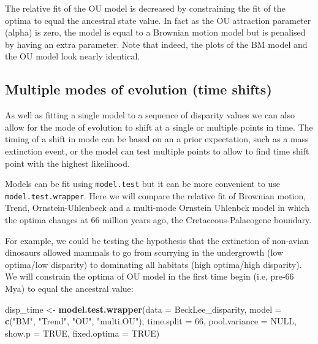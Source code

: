 \documentclass[
]{book}
\newenvironment{Shaded}{\begin{snugshade}}{\end{snugshade}}
\newcommand{\AttributeTok}[1]{\textcolor[rgb]{0.13,0.29,0.53}{#1}}
\newcommand{\ConstantTok}[1]{\textcolor[rgb]{0.56,0.35,0.01}{#1}}
\newcommand{\DecValTok}[1]{\textcolor[rgb]{0.00,0.00,0.81}{#1}}
\newcommand{\FunctionTok}[1]{\textcolor[rgb]{0.13,0.29,0.53}{\textbf{#1}}}
\newcommand{\NormalTok}[1]{#1}
\newcommand{\OtherTok}[1]{\textcolor[rgb]{0.56,0.35,0.01}{#1}}
\newcommand{\StringTok}[1]{\textcolor[rgb]{0.31,0.60,0.02}{#1}}
\begin{document}
The relative fit of the OU model is decreased by constraining the fit of the optima to equal the ancestral state value.
In fact as the OU attraction parameter (alpha) is zero, the model is equal to a Brownian motion model but is penalised by having an extra parameter.
Note that indeed, the plots of the BM model and the OU model look nearly identical.

\hypertarget{multiple-modes-of-evolution-time-shifts}{%
\subsection{Multiple modes of evolution (time shifts)}\label{multiple-modes-of-evolution-time-shifts}}

As well as fitting a single model to a sequence of disparity values we can also allow for the mode of evolution to shift at a single or multiple points in time.
The timing of a shift in mode can be based on an a prior expectation, such as a mass extinction event, or the model can test multiple points to allow to find time shift point with the highest likelihood.

Models can be fit using \texttt{model.test} but it can be more convenient to use \texttt{model.test.wrapper}.
Here we will compare the relative fit of Brownian motion, Trend, Ornstein-Uhlenbeck and a multi-mode Ornstein Uhlenbck model in which the optima changes at 66 million years ago, the Cretaceous-Palaeogene boundary.

For example, we could be testing the hypothesis that the extinction of non-avian dinosaurs allowed mammals to go from scurrying in the undergrowth (low optima/low disparity) to dominating all habitats (high optima/high disparity).
We will constrain the optima of OU model in the first time begin (i.e, pre-66 Mya) to equal the ancestral value:

\begin{Shaded}
\begin{Highlighting}[]
\NormalTok{disp\_time }\OtherTok{\textless{}{-}} \FunctionTok{model.test.wrapper}\NormalTok{(}\AttributeTok{data =}\NormalTok{ BeckLee\_disparity,}
                        \AttributeTok{model =} \FunctionTok{c}\NormalTok{(}\StringTok{"BM"}\NormalTok{, }\StringTok{"Trend"}\NormalTok{, }\StringTok{"OU"}\NormalTok{, }\StringTok{"multi.OU"}\NormalTok{),}
                                \AttributeTok{time.split =} \DecValTok{66}\NormalTok{,}
                                \AttributeTok{pool.variance =} \ConstantTok{NULL}\NormalTok{,}
                                \AttributeTok{show.p =} \ConstantTok{TRUE}\NormalTok{,}
                                \AttributeTok{fixed.optima =} \ConstantTok{TRUE}\NormalTok{)}
\end{Highlighting}
\end{Shaded}
\end{document}
